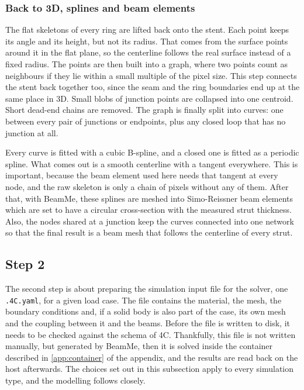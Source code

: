 \subsubsection{Back to 3D, splines and beam elements}
\label{sec:substep4-3d}

The flat skeletons of every ring are lifted back onto the stent. Each point keeps its angle and its height, but not its radius. That comes from the surface points around it in the flat plane, so the centerline follows the real surface instead of a fixed radius. The points are then built into a graph, where two points count as neighbours if they lie within a small multiple of the pixel size. This step connects the stent back together too, since the seam and the ring boundaries end up at the same place in 3D. Small blobs of junction points are collapsed into one centroid. Short dead-end chains are removed. The graph is finally split into curves: one between every pair of junctions or endpoints, plus any closed loop that has no junction at all. 

Every curve is fitted with a cubic B-spline, and a closed one is fitted as a periodic spline. What comes out is a smooth centerline with a tangent everywhere. This is important, because the beam element used here needs that tangent at every node, and the raw skeleton is only a chain of pixels without any of them. After that, with BeamMe, these splines are meshed into Simo-Reissner beam elements which are set to have a circular cross-section with the measured strut thickness. Also, the nodes shared at a junction keep the curves connected into one network so that the final result is a beam mesh that follows the centerline of every strut.


\subsection{Step 2}
\label{sec:step-2}

The second step is about preparing the simulation input file for the solver, one \texttt{.4C.yaml}, for a given load case. The file contains the material, the mesh, the boundary conditions and, if a solid body is also part of the case, its own mesh and the coupling between it and the beams. Before the file is written to disk, it needs to be checked against the schema of 4C. Thankfully, this file is not written manually, but generated by BeamMe, then it is solved inside the container described in \cref{app:container} of the appendix, and the results are read back on the host afterwards. The choices set out in this subsection apply to every simulation type, and the modelling follows \citet{datz2025} closely.

